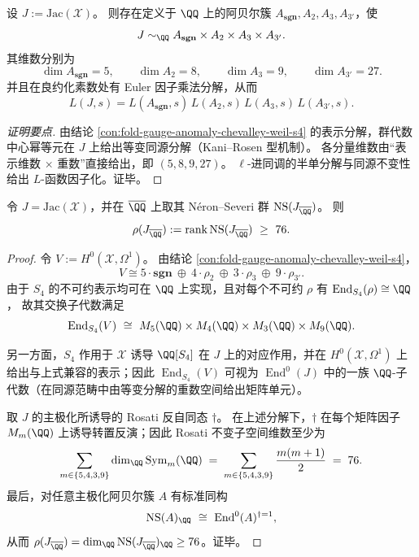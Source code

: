 \begin{conclusion}\label{con:fold-gauge-anomaly-jacobian-equivariant-factorization}
设 \(J:=\mathrm{Jac}(\mathcal X)\)。
则存在定义于 \(\QQ\) 上的阿贝尔簇 \(A_{\mathbf{sgn}},A_2,A_3,A_{3'}\)，使
\[
J\sim_{\QQ}A_{\mathbf{sgn}}\times A_2\times A_3\times A_{3'}.
\]
其维数分别为
\[
\dim A_{\mathbf{sgn}}=5,\qquad \dim A_2=8,\qquad \dim A_3=9,\qquad \dim A_{3'}=27.
\]
并且在良约化素数处有 Euler 因子乘法分解，从而
\[
L(J,s)=L(A_{\mathbf{sgn}},s)\,L(A_2,s)\,L(A_3,s)\,L(A_{3'},s).
\]
\end{conclusion}
\begin{proof}[证明要点]
由结论 \ref{con:fold-gauge-anomaly-chevalley-weil-s4} 的表示分解，群代数中心幂等元在 \(J\) 上给出等变同源分解（Kani--Rosen 型机制）。
各分量维数由“表示维数 \(\times\) 重数”直接给出，即 \((5,8,9,27)\)。
\(\ell\)-进同调的半单分解与同源不变性给出 \(L\)-函数因子化。证毕。
\end{proof}

\begin{theorem}\label{thm:fold-gauge-anomaly-s4-jacobian-picard-rank-lower-bound-76}
令 \(J=\mathrm{Jac}(\mathcal X)\)，并在 \(\overline{\QQ}\) 上取其 N\'eron--Severi 群 \(\mathrm{NS}(J_{\overline{\QQ}})\)。
则
\[
\rho(J_{\overline{\QQ}}):=\mathrm{rank}\,\mathrm{NS}(J_{\overline{\QQ}})\ \ge\ 76.
\]
\end{theorem}
\begin{proof}
令
\(
V:=H^{0}(\mathcal X,\Omega^{1})
\)。
由结论 \ref{con:fold-gauge-anomaly-chevalley-weil-s4}，
\[
V\cong
5\cdot \mathbf{sgn}\ \oplus\ 4\cdot \rho_{2}\ \oplus\ 3\cdot \rho_{3}\ \oplus\ 9\cdot \rho_{3'}.
\]
由于 \(S_4\) 的不可约表示均可在 \(\QQ\) 上实现，且对每个不可约 \(\rho\) 有 \(\operatorname{End}_{S_4}(\rho)\cong\QQ\)，
故其交换子代数满足
\[
\operatorname{End}_{S_4}(V)\ \cong\ M_{5}(\QQ)\times M_{4}(\QQ)\times M_{3}(\QQ)\times M_{9}(\QQ).
\]
\par
另一方面，\(S_4\) 作用于 \(\mathcal X\) 诱导 \(\QQ[S_4]\) 在 \(J\) 上的对应作用，并在
\(
H^{0}(\mathcal X,\Omega^{1})
\)
上给出与上式兼容的表示；因此 \(\operatorname{End}_{S_4}(V)\) 可视为 \(\operatorname{End}^{0}(J)\) 中的一族 \(\QQ\)-子代数（在同源范畴中由等变分解的重数空间给出矩阵单元）。
\par
取 \(J\) 的主极化所诱导的 Rosati 反自同态 \(\dagger\)。
在上述分解下，\(\dagger\) 在每个矩阵因子 \(M_m(\QQ)\) 上诱导转置反演；因此 Rosati 不变子空间维数至少为
\[
\sum_{m\in\{5,4,3,9\}}\dim_{\QQ}\mathrm{Sym}_{m}(\QQ)
\;=\;
\sum_{m\in\{5,4,3,9\}}\frac{m(m+1)}{2}
\;=\;76.
\]
最后，对任意主极化阿贝尔簇 \(A\) 有标准同构
\[
\mathrm{NS}(A)_{\QQ}\ \cong\ \operatorname{End}^{0}(A)^{\dagger=1},
\]
从而 \(\rho(J_{\overline{\QQ}})=\dim_{\QQ}\mathrm{NS}(J_{\overline{\QQ}})_{\QQ}\ge 76\)。证毕。
\end{proof}

